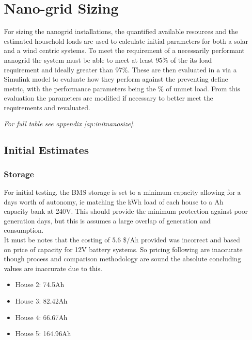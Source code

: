 \documentclass[journal]{IEEEtran}
\begin{document}
\section{Nano-grid Sizing}
For sizing the nanogrid installations, the quantified available resources and the estimated household loads are used to calculate initial parameters for both a solar and a wind centric systems.
To meet the requirement of a necessarily performant nanogrid the system must be able to meet at least 95\% of the its load requirement and ideally greater than 97\%.   
 These are then evaluated in a via a Simulink model to evaluate how they perform against the preventing define metric, with the performance parameters being the \% of unmet load.
 From this evaluation the parameters are modified if necessary to better meet the requirements and revaluated.   

\textit{For full table see appendix \ref{ap:initnanosize}.}
        \subsection{Initial Estimates}
                \subsubsection*{Storage}
                For initial testing, the BMS storage is set to a minimum capacity allowing for a days worth of autonomy, ie matching the kWh load of each house to a Ah capacity bank at 240V. This should provide the minimum protection against poor generation days, but this is assumes a large overlap of generation and consumption.\\

                It must be notes that the costing of 5.6 \$/Ah provided\cite{DANNYB} was incorrect and based on price of capacity for 12V battery systems. So pricing following are inaccurate though process and comparison methodology are sound the absolute concluding values are inaccurate due to this.
                \begin{itemize}
                        \item House 2: 74.5Ah
                        \item House 3: 82.42Ah
                        \item House 4: 66.67Ah
                        \item House 5: 164.96Ah
                \end{itemize}
\end{document}
